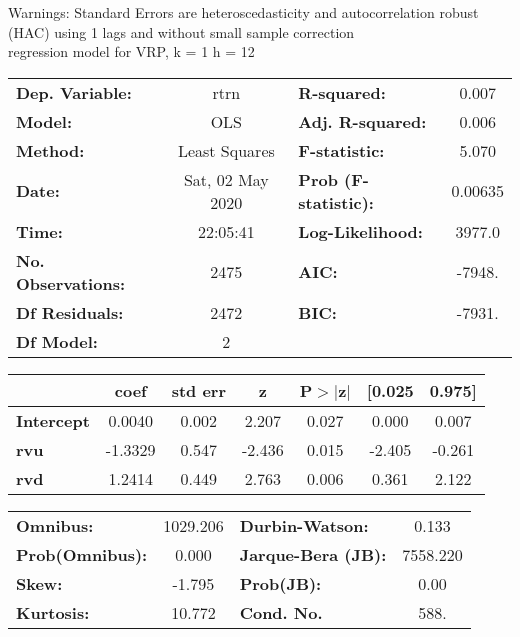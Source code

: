 Warnings: \newline
 [1] Standard Errors are heteroscedasticity and autocorrelation robust (HAC) using 1 lags and without small sample correction\\ 

regression model for VRP, k = 1 h = 12\begin{center}
\begin{tabular}{lclc}
\toprule
\textbf{Dep. Variable:}    &       rtrn       & \textbf{  R-squared:         } &     0.007   \\
\textbf{Model:}            &       OLS        & \textbf{  Adj. R-squared:    } &     0.006   \\
\textbf{Method:}           &  Least Squares   & \textbf{  F-statistic:       } &     5.070   \\
\textbf{Date:}             & Sat, 02 May 2020 & \textbf{  Prob (F-statistic):} &  0.00635    \\
\textbf{Time:}             &     22:05:41     & \textbf{  Log-Likelihood:    } &    3977.0   \\
\textbf{No. Observations:} &        2475      & \textbf{  AIC:               } &    -7948.   \\
\textbf{Df Residuals:}     &        2472      & \textbf{  BIC:               } &    -7931.   \\
\textbf{Df Model:}         &           2      & \textbf{                     } &             \\
\bottomrule
\end{tabular}
\begin{tabular}{lcccccc}
                   & \textbf{coef} & \textbf{std err} & \textbf{z} & \textbf{P$> |$z$|$} & \textbf{[0.025} & \textbf{0.975]}  \\
\midrule
\textbf{Intercept} &       0.0040  &        0.002     &     2.207  &         0.027        &        0.000    &        0.007     \\
\textbf{rvu}       &      -1.3329  &        0.547     &    -2.436  &         0.015        &       -2.405    &       -0.261     \\
\textbf{rvd}       &       1.2414  &        0.449     &     2.763  &         0.006        &        0.361    &        2.122     \\
\bottomrule
\end{tabular}
\begin{tabular}{lclc}
\textbf{Omnibus:}       & 1029.206 & \textbf{  Durbin-Watson:     } &    0.133  \\
\textbf{Prob(Omnibus):} &   0.000  & \textbf{  Jarque-Bera (JB):  } & 7558.220  \\
\textbf{Skew:}          &  -1.795  & \textbf{  Prob(JB):          } &     0.00  \\
\textbf{Kurtosis:}      &  10.772  & \textbf{  Cond. No.          } &     588.  \\
\bottomrule
\end{tabular}
\end{center}

